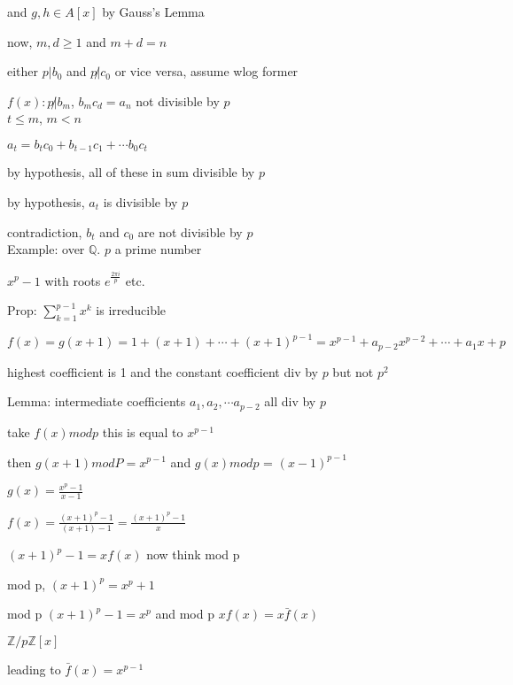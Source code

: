 \documentclass[12pt]{article}
\begin{document}
and $g, h \in A[x]$ by Gauss's Lemma

now, $m, d \geq 1$ and $m + d = n$

either $p |b_0$ and $p \not | c_0$ or vice versa, assume wlog former

$f(x): p \not | b_m$, $b_mc_d = a_n$ not divisible by $p$\\

$t \leq m$, $m < n$

$a_t = b_tc_0 + b_{t - 1}c_1 + \cdots b_0c_t$

by hypothesis, all of these in sum divisible by $p$

by hypothesis, $a_t$ is divisible by $p$

contradiction, $b_t$ and $c_0$ are not divisible by $p$\\

\noindent
Example: over $\mathds{Q}$. $p$ a prime number

$x^p - 1$ with roots $e^{\frac{2\pi i}{p}}$ etc.

Prop: $\sum_{k = 1}^{p - 1}x^k$ is irreducible

$f(x) = g(x + 1) = 1 + (x + 1) + \cdots + (x + 1)^{p - 1} = x^{p - 1} + a_{p - 2}x^{p - 2} + \cdots + a_1x + p$

highest coefficient is 1 and the constant coefficient div by $p$ but not $p^2$

Lemma: intermediate coefficients $a_1, a_2, \cdots a_{p - 2}$ all div by $p$

take $f(x) mod p$ this is equal to $x^{p-1}$

then $g(x + 1) mod P = x^{p - 1}$ and $g(x) mod p$ = $(x - 1)^{p - 1}$

$g(x) = \frac{x^{p} - 1}{x - 1}$

$f(x) = \frac{(x + 1)^p - 1}{(x + 1) - 1} = \frac{(x + 1)^p - 1}{x}$

$(x + 1)^p - 1 = xf(x)$ now think mod p

mod p, $(x + 1)^p = x^p + 1$

mod p $(x + 1)^p - 1 = x^p$ and mod p $xf(x) = x \bar{f}(x)$

$\mathds{Z}/p\mathds{Z}[x]$

leading to $\bar{f}(x) = x^{p - 1}$
\end{document}
